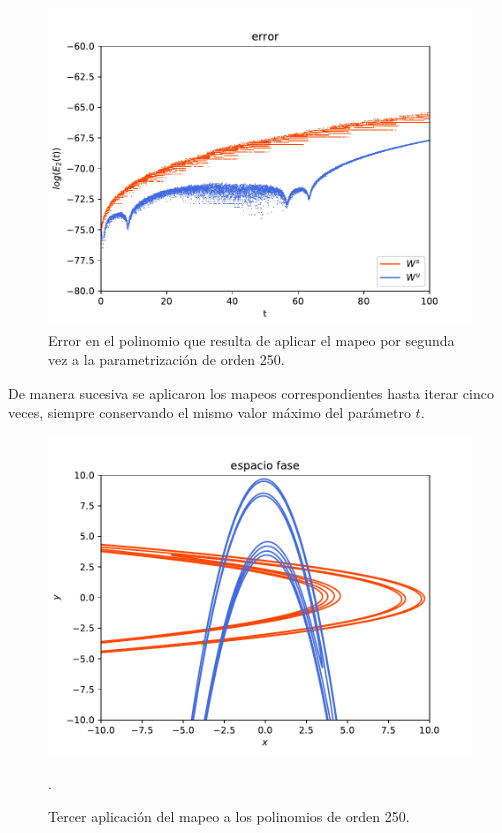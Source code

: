 \begin{figure}[H]
\centering
\includegraphics[scale=0.6]{error2ite}
\caption{Error en el polinomio que resulta de aplicar el mapeo por segunda vez a la parametrización de orden 250.}
\label{error-2iteracion}
\end{figure}

De manera sucesiva se aplicaron los mapeos correspondientes hasta iterar cinco veces, siempre conservando el mismo valor máximo del parámetro $t$.
\begin{figure}[H]
\centering
\includegraphics[scale=0.6]{rectangulo3}
\caption{Tercer aplicación del mapeo a los polinomios de orden 250.}.
\label{Rectangulo3}
\end{figure}

